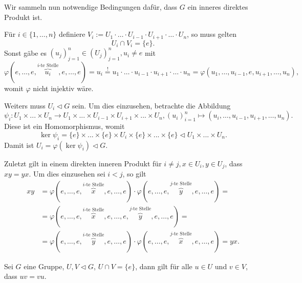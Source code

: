 \begin{remark} \label{remark:inneres-direktes-produkt-notwendig}
    Wir sammeln nun notwendige Bedingungen dafür, dass $G$ ein inneres direktes Produkt ist.
    
    Für $i \in \{ 1,\hdots,n \}$ definiere $V_i := U_1 \cdot \hdots \cdot U_{i-1} \cdot U_{i+1} \cdot \hdots \cdot U_n$, so muss gelten
    $$ U_i \cap V_i = \{ e \}. $$
    Sonst gäbe es $(u_j)_{j=1}^n \in (U_j)_{j=1}^n, u_i \neq e$ mit
    $$ \varphi(e, \hdots, e, \overbrace{u_i}^{\textrm{$i$-te Stelle}}, e, \hdots, e) = u_i \overset{!}{=} u_1 \cdot \hdots \cdot u_{i-1} \cdot u_{i+1} \cdot \hdots \cdot u_n = \varphi(u_1, \hdots, u_{i-1}, e, u_{i+1}, \hdots, u_n), $$
    womit $\varphi$ nicht injektiv wäre.

    Weiters muss $U_i \vartriangleleft G$ sein. Um dies einzusehen, betrachte die Abbildung
    $$ \psi_i : U_1 \times ... \times U_n \to U_1 \times ... \times U_{i-1} \times U_{i+1} \times ... \times U_n, (u_i)_{i=1}^n \mapsto (u_i, \hdots, u_{i-1}, u_{i+1}, \hdots, u_n). $$
    Diese ist ein Homomorphismus, womit
    $$ \ker \psi_i = \{e\} \times ... \times \{e\} \times U_i \times \{e\} \times ... \times \{e\} \vartriangleleft U_1 \times ... \times U_n. $$
    Damit ist $U_i = \varphi(\ker \psi_i) \vartriangleleft G$.

    Zuletzt gilt in einem direkten inneren Produkt für $i \neq j, x \in U_i, y \in U_j$, dass $xy = yx$. Um dies einzusehen sei \obda $i < j$, so gilt
    \begin{align*}        
        xy &= \varphi(e, \hdots, e, \overbrace{x}^{\textrm{$i$-te Stelle}}, e, \hdots, e) \cdot \varphi(e, \hdots, e, \overbrace{y}^{\textrm{$j$-te Stelle}}, e, \hdots, e) =  \\ &= \varphi(e, \hdots, e, \overbrace{x}^{\textrm{$i$-te Stelle}}, e, \hdots, e, \overbrace{y}^{\textrm{$j$-te Stelle}}, e, \hdots, e) = \\ &= \varphi(e, \hdots, e, \overbrace{y}^{\textrm{$i$-te Stelle}}, e, \hdots, e) \cdot \varphi(e, \hdots, e, \overbrace{x}^{\textrm{$j$-te Stelle}}, e, \hdots, e) = yx.
    \end{align*}
\end{remark}

\begin{lemma} \label{lemma:gruppe-normalteiler-kommutativ}
    Sei $G$ eine Gruppe, $U, V \vartriangleleft G$, $U \cap V = \{ e \}$, dann gilt für alle $u \in U$ und $v \in V$, dass $uv = vu$.
\end{lemma}

